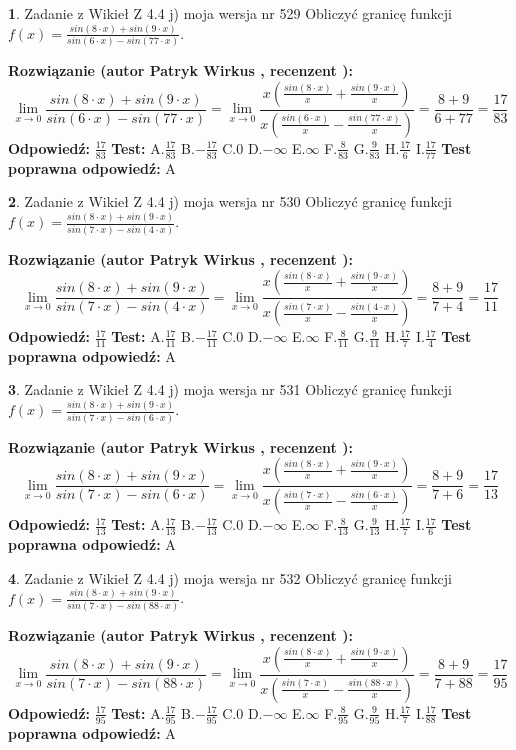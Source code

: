 \documentclass[12pt, a4paper]{article}
\theoremstyle{definition} %
\newtheorem{zad}{}
\newcommand{\zadStart}[1]{\begin{zad}#1\newline}
\newcommand{\zadStop}{\end{zad}}
\newcommand{\rozwStart}[2]{\noindent \textbf{Rozwiązanie (autor #1 , recenzent #2): }\newline}
\newcommand{\rozwStop}{\newline}
\newcommand{\odpStart}{\noindent \textbf{Odpowiedź:}\newline}
\newcommand{\odpStop}{\newline}
\newcommand{\testStart}{\noindent \textbf{Test:}\newline}
\newcommand{\testStop}{\newline}
\newcommand{\kluczStart}{\noindent \textbf{Test poprawna odpowiedź:}\newline}
\newcommand{\kluczStop}{\newline}
\begin{document}
\zadStart{Zadanie z Wikieł Z 4.4 j) moja wersja nr 529}
Obliczyć granicę funkcji $f(x)=\frac{sin(8\cdot x) +sin(9\cdot x)}{sin(6\cdot x) -sin(77\cdot x)}$.
\zadStop
\rozwStart{Patryk Wirkus}{}
$$\lim\limits_{x\to 0}\frac{sin(8\cdot x) +sin(9\cdot x)}{sin(6\cdot x) -sin(77\cdot x)}=\lim\limits_{x\to 0}\frac{x(\frac{sin(8\cdot x)}{x}+\frac{sin(9\cdot x)}{x})}{x(\frac{sin(6\cdot x)}{x}-\frac{sin(77\cdot x)}{x})}=\frac{8+9}{6+77} = \frac{17}{83}$$
\rozwStop
\odpStart
$\frac{17}{83}$
\odpStop
\testStart
A.$\frac{17}{83}$
B.$-\frac{17}{83}$
C.$0$
D.$-\infty$
E.$\infty$
F.$\frac{8}{83}$
G.$\frac{9}{83}$
H.$\frac{17}{6}$
I.$\frac{17}{77}$
\testStop
\kluczStart
A
\kluczStop



\zadStart{Zadanie z Wikieł Z 4.4 j) moja wersja nr 530}
Obliczyć granicę funkcji $f(x)=\frac{sin(8\cdot x) +sin(9\cdot x)}{sin(7\cdot x) -sin(4\cdot x)}$.
\zadStop
\rozwStart{Patryk Wirkus}{}
$$\lim\limits_{x\to 0}\frac{sin(8\cdot x) +sin(9\cdot x)}{sin(7\cdot x) -sin(4\cdot x)}=\lim\limits_{x\to 0}\frac{x(\frac{sin(8\cdot x)}{x}+\frac{sin(9\cdot x)}{x})}{x(\frac{sin(7\cdot x)}{x}-\frac{sin(4\cdot x)}{x})}=\frac{8+9}{7+4} = \frac{17}{11}$$
\rozwStop
\odpStart
$\frac{17}{11}$
\odpStop
\testStart
A.$\frac{17}{11}$
B.$-\frac{17}{11}$
C.$0$
D.$-\infty$
E.$\infty$
F.$\frac{8}{11}$
G.$\frac{9}{11}$
H.$\frac{17}{7}$
I.$\frac{17}{4}$
\testStop
\kluczStart
A
\kluczStop



\zadStart{Zadanie z Wikieł Z 4.4 j) moja wersja nr 531}
Obliczyć granicę funkcji $f(x)=\frac{sin(8\cdot x) +sin(9\cdot x)}{sin(7\cdot x) -sin(6\cdot x)}$.
\zadStop
\rozwStart{Patryk Wirkus}{}
$$\lim\limits_{x\to 0}\frac{sin(8\cdot x) +sin(9\cdot x)}{sin(7\cdot x) -sin(6\cdot x)}=\lim\limits_{x\to 0}\frac{x(\frac{sin(8\cdot x)}{x}+\frac{sin(9\cdot x)}{x})}{x(\frac{sin(7\cdot x)}{x}-\frac{sin(6\cdot x)}{x})}=\frac{8+9}{7+6} = \frac{17}{13}$$
\rozwStop
\odpStart
$\frac{17}{13}$
\odpStop
\testStart
A.$\frac{17}{13}$
B.$-\frac{17}{13}$
C.$0$
D.$-\infty$
E.$\infty$
F.$\frac{8}{13}$
G.$\frac{9}{13}$
H.$\frac{17}{7}$
I.$\frac{17}{6}$
\testStop
\kluczStart
A
\kluczStop



\zadStart{Zadanie z Wikieł Z 4.4 j) moja wersja nr 532}
Obliczyć granicę funkcji $f(x)=\frac{sin(8\cdot x) +sin(9\cdot x)}{sin(7\cdot x) -sin(88\cdot x)}$.
\zadStop
\rozwStart{Patryk Wirkus}{}
$$\lim\limits_{x\to 0}\frac{sin(8\cdot x) +sin(9\cdot x)}{sin(7\cdot x) -sin(88\cdot x)}=\lim\limits_{x\to 0}\frac{x(\frac{sin(8\cdot x)}{x}+\frac{sin(9\cdot x)}{x})}{x(\frac{sin(7\cdot x)}{x}-\frac{sin(88\cdot x)}{x})}=\frac{8+9}{7+88} = \frac{17}{95}$$
\rozwStop
\odpStart
$\frac{17}{95}$
\odpStop
\testStart
A.$\frac{17}{95}$
B.$-\frac{17}{95}$
C.$0$
D.$-\infty$
E.$\infty$
F.$\frac{8}{95}$
G.$\frac{9}{95}$
H.$\frac{17}{7}$
I.$\frac{17}{88}$
\testStop
\kluczStart
A
\kluczStop
\end{document}
